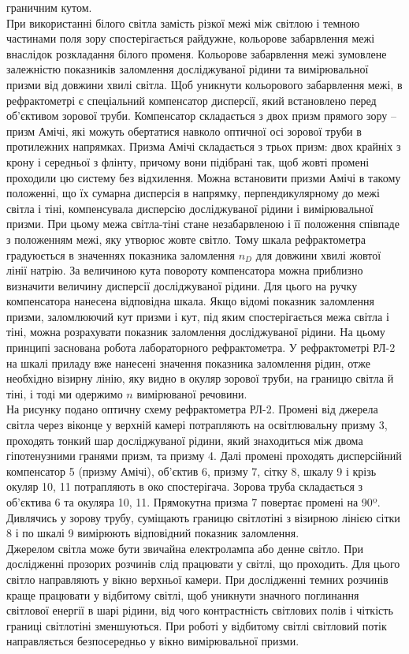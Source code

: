граничним кутом. \\
При використанні білого світла замість різкої межі між світлою і темною частинами поля зору спостерігається райдужне, кольорове забарвлення межі внаслідок розкладання білого променя. Кольорове забарвлення межі зумовлене залежністю показників заломлення досліджуваної рідини та вимірювальної призми від довжини хвилі світла.
Щоб уникнути кольорового забарвлення межі, в рефрактометрі є спеціальний компенсатор дисперсії, який встановлено перед об’єктивом зорової труби. Компенсатор складається з двох призм прямого зору – призм Амічі, які можуть обертатися навколо оптичної осі зорової труби в протилежних напрямках. Призма Амічі складається з трьох призм: двох крайніх з крону і середньої з флінту, причому вони підібрані так, щоб жовті промені проходили цю систему без відхилення. Можна встановити призми Амічі в такому положенні, що їх сумарна дисперсія в напрямку, перпендикулярному до межі світла і тіні, компенсувала дисперсію досліджуваної рідини і вимірювальної призми. При цьому межа світла-тіні стане незабарвленою і її положення співпаде з положенням межі, яку утворює жовте світло. Тому шкала рефрактометра градуюється
в значеннях показника заломлення $n_D$ для довжини хвилі жовтої лінії натрію. За величиною кута повороту компенсатора можна приблизно визначити величину дисперсії досліджуваної рідини. Для цього на ручку компенсатора нанесена відповідна шкала. Якщо відомі показник заломлення призми, заломлюючий кут призми і кут, під яким
спостерігається межа світла і тіні, можна розрахувати показник заломлення досліджуваної рідини. На цьому принципі заснована робота лабораторного рефрактометра. У рефрактометрі РЛ-2 на шкалі приладу вже нанесені значення показника заломлення рідин, отже необхідно
візирну лінію, яку видно в окуляр зорової труби, на границю світла й тіні, і тоді ми одержимо $n$ вимірюваної речовини.\\
На рисунку подано оптичну схему рефрактометра РЛ-2. Промені від джерела світла через
віконце у верхній камері потрапляють на освітлювальну призму 3, проходять тонкий шар
досліджуваної рідини, який знаходиться між двома гіпотенузними гранями призм, та призму 4. 
Далі промені проходять дисперсійний компенсатор 5 (призму Амічі), об’єктив 6, призму 7, сітку
8, шкалу 9 і крізь окуляр 10, 11 потрапляють в око спостерігача. Зорова труба складається з
об’єктива 6 та окуляра 10, 11. Прямокутна призма 7 повертає промені на 90º.
\\
Дивлячись у зорову трубу, суміщають границю світлотіні з візирною лінією сітки 8 і по
шкалі 9 вимірюють відповідний показник заломлення. \\
Джерелом світла може бути звичайна електролампа або денне світло. При дослідженні
прозорих розчинів слід працювати у світлі, що проходить. Для цього світло направляють у вікно
верхньої камери. При дослідженні темних розчинів краще працювати у відбитому світлі, щоб
уникнути значного поглинання світлової енергії в шарі рідини, від чого контрастність світлових
полів і чіткість границі світлотіні зменшуються. При роботі у відбитому світлі світловий потік
направляється безпосередньо у вікно вимірювальної призми.

